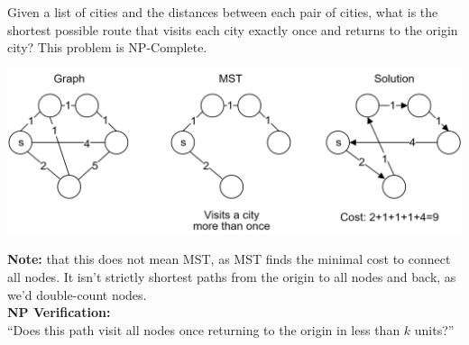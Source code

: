 \newpage 
\begin{theo}

    \label{TSP}

    Given a list of cities and the distances between each pair of cities, 
    what is the shortest possible route that visits each city exactly once and returns to the origin city?
    This problem is NP-Complete. 

    \begin{center}
    \includegraphics[width=1\textwidth]{Sections/hard/graphs.png}
    \end{center}
    \noindent
    \textbf{Note:} that this does not mean MST, as MST finds the minimal cost to connect all nodes. It isn't strictly shortest paths
    from the origin to all nodes and back, as we'd double-count nodes.\\

    \noindent
    \textbf{NP Verification:}\\
    ``Does this path visit all nodes once returning to the origin in less than $k$ units?''

\end{theo}
    
